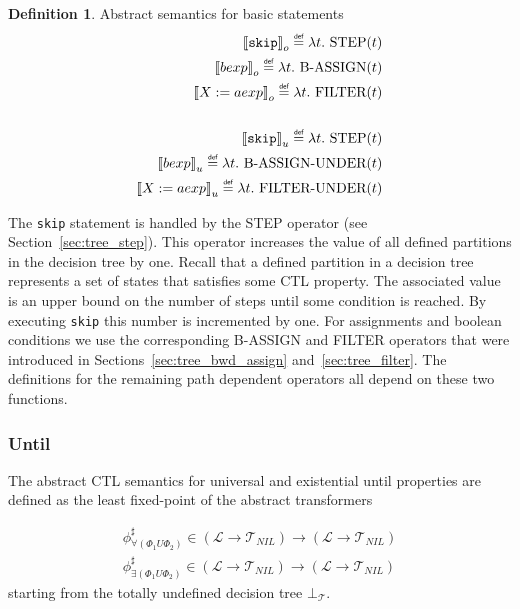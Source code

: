 \documentclass[11pt,a4paper,titlepage]{article}
\theoremstyle{definition}
\newtheorem{definition}{Definition}[section]
\newcommand\eqdef{\mathrel{\overset{\makebox[0pt]{\mbox{\normalfont\tiny\sffamily def}}}{=}}}
\begin{document}
\begin{definition}\label{def:basic_expression_transformer}
    Abstract semantics for basic statements
    \begin{align*}
        {\llbracket \mathtt{skip} \rrbracket}_o \eqdef \lambda t. \ \text{STEP}(t)\\
        {\llbracket bexp \rrbracket}_o \eqdef \lambda t. \ \text{B-ASSIGN}(t)\\
        {\llbracket X := aexp \rrbracket}_o \eqdef \lambda t. \ \text{FILTER}(t)\\
        \\
        {\llbracket \mathtt{skip} \rrbracket}_u \eqdef \lambda t. \ \text{STEP}(t)\\
        {\llbracket bexp \rrbracket}_u \eqdef \lambda t. \ \text{B-ASSIGN-UNDER}(t)\\
        {\llbracket X := aexp \rrbracket}_u \eqdef \lambda t. \ \text{FILTER-UNDER}(t)\\
    \end{align*}
\end{definition}

The \texttt{skip} statement is handled by the STEP operator (see Section~\ref{sec:tree_step}). This operator increases the value of all defined
partitions in the decision tree by one. Recall that a defined partition in a decision tree represents a set of states that satisfies 
some CTL property. The associated value is an upper bound on the number of steps until some condition is reached. 
By executing \texttt{skip} this number is incremented by one.
For assignments and boolean conditions we use the corresponding B-ASSIGN and FILTER 
operators that were introduced in Sections~\ref{sec:tree_bwd_assign} and~\ref{sec:tree_filter}.
The definitions for the remaining path dependent operators all depend on these two functions.

\subsubsection*{Until}
The abstract CTL semantics for universal and existential \textsf{until} properties are defined as the least fixed-point of the abstract transformers

\begin{align*}
    \phi^\sharp_{\forall(\Phi_1 U \Phi_2)}
    \in (\mathcal{L} \rightarrow \mathcal{T}_{NIL}) \rightarrow (\mathcal{L} \rightarrow \mathcal{T}_{NIL})\\
    \phi^\sharp_{\exists(\Phi_1 U \Phi_2)} 
    \in (\mathcal{L} \rightarrow \mathcal{T}_{NIL}) \rightarrow (\mathcal{L} \rightarrow \mathcal{T}_{NIL})
\end{align*}
starting from the totally undefined decision tree $\bot_\mathcal{T}$.
\end{document}
